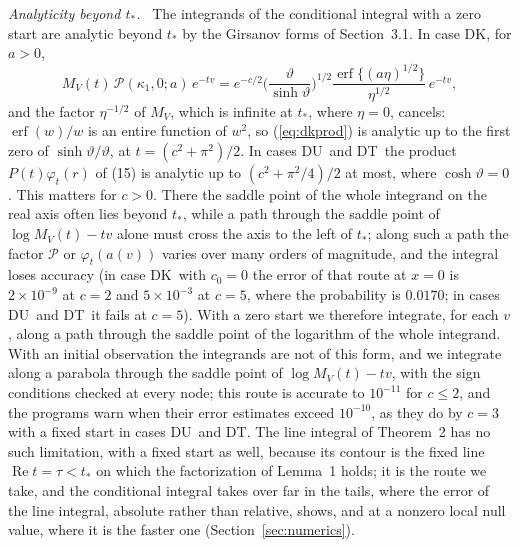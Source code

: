 \documentclass[ecta,nameyear,final,supplement]{econsocart}
\newcommand{\Rea}{\operatorname{Re}}
\newcommand{\erf}{\operatorname{erf}}
\newcommand{\Fk}{\textsf{\upshape DK}}
\newcommand{\Fu}{\textsf{\upshape DU}}
\newcommand{\Ft}{\textsf{\upshape DT}}
\newcommand{\cP}{\mathcal{P}}
\theoremstyle{plain}
\theoremstyle{definition}
\newcommand{\runin}[1]{\par\medskip\noindent\textit{#1.}\ \ignorespaces}
\begin{document}
\runin{Analyticity beyond $t_*$}  The integrands of the conditional integral with a zero start are analytic beyond $t_*$ by the Girsanov forms of Section~3.1.  In case \Fk, for $a>0$,
\begin{equation}
M_V(t)\,\cP(\kappa_1,0;a)\,e^{-tv}=e^{-c/2}\Big(\frac{\vartheta}{\sinh\vartheta}\Big)^{1/2}\frac{\erf\{(a\eta)^{1/2}\}}{\eta^{1/2}}\,e^{-tv},
\label{eq:dkprod}
\end{equation}
and the factor $\eta^{-1/2}$ of $M_V$, which is infinite at $t_*$, where $\eta=0$, cancels: $\erf(w)/w$ is an entire function of $w^2$, so (\ref{eq:dkprod}) is analytic up to the first zero of $\sinh\vartheta/\vartheta$, at $t=(c^2+\pi^2)/2$.  In cases \Fu\ and \Ft\ the product $P(t)\varphi_t(r)$ of (15) is analytic up to $(c^2+\pi^2/4)/2$ at most, where $\cosh\vartheta=0$.  This matters for $c>0$.  There the saddle point of the whole integrand on the real axis often lies beyond $t_*$, while a path through the saddle point of $\log M_V(t)-tv$ alone must cross the axis to the left of $t_*$; along such a path the factor $\cP$ or $\varphi_t(a(v))$ varies over many orders of magnitude, and the integral loses accuracy (in case \Fk\ with $c_0=0$ the error of that route at $x=0$ is $2\times10^{-9}$ at $c=2$ and $5\times10^{-3}$ at $c=5$, where the probability is $0.0170$; in cases \Fu\ and \Ft\ it fails at $c=5$).  With a zero start we therefore integrate, for each $v$, along a path through the saddle point of the logarithm of the whole integrand.  With an initial observation the integrands are not of this form, and we integrate along a parabola through the saddle point of $\log M_V(t)-tv$, with the sign conditions checked at every node; this route is accurate to $10^{-11}$ for $c\le2$, and the programs warn when their error estimates exceed $10^{-10}$, as they do by $c=3$ with a fixed start in cases \Fu\ and \Ft.  The line integral of Theorem~2 has no such limitation, with a fixed start as well, because its contour is the fixed line $\Rea t=\tau<t_*$ on which the factorization of Lemma~1 holds; it is the route we take, and the conditional integral takes over far in the tails, where the error of the line integral, absolute rather than relative, shows, and at a nonzero local null value, where it is the faster one (Section~\ref{sec:numerics}).
\end{document}
